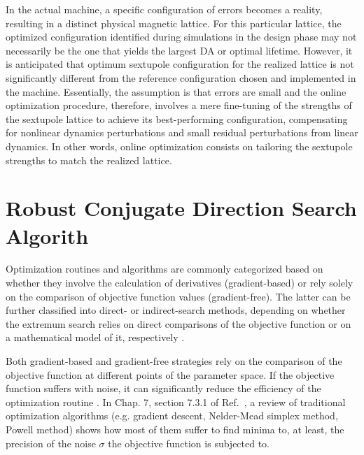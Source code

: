 In the actual machine, a specific configuration of errors becomes a reality, resulting in a distinct physical magnetic lattice. For this particular lattice, the optimized configuration identified during simulations in the design phase may not necessarily be the one that yields the largest \gls*{DA} or optimal lifetime. However, it is anticipated that optimum sextupole configuration for the realized lattice is not significantly different from the reference configuration chosen and implemented in the machine. Essentially, the assumption is that errors are small and the online optimization procedure, therefore, involves a mere fine-tuning of the strengths of the sextupole lattice to achieve its best-performing configuration, compensating for nonlinear dynamics perturbations and small residual perturbations from linear dynamics. In other words, online optimization consists on tailoring the sextupole strengths to match the realized lattice.

\section{Robust Conjugate Direction Search Algorith}
Optimization routines and algorithms are commonly categorized based on whether they involve the calculation of derivatives (gradient-based) or rely solely on the comparison of objective function values (gradient-free). The latter can be further classified into direct- or indirect-search methods, depending on whether the extremum search relies on direct comparisons of the objective function or on a mathematical model of it, respectively \cite{press_numerical_2007}.

Both gradient-based and gradient-free strategies rely on the comparison of the objective function at different points of the parameter space. If the objective function suffers with noise, it can significantly reduce the efficiency of the optimization routine \cite{press_numerical_2007, huang_beam-based_2019}. In Chap. 7, section 7.3.1 of Ref.~\cite{huang_beam-based_2019}, a review of traditional optimization algorithms (e.g. gradient descent, Nelder-Mead simplex method, Powell method) shows how most of them suffer to find minima to, at least, the precision of the noise $\sigma$ the objective function is subjected to.

